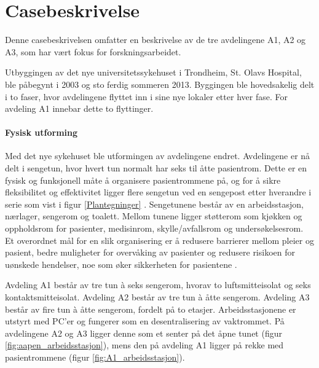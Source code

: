 \chapter{Casebeskrivelse}
\label{chp:case}
Denne casebeskrivelsen omfatter en beskrivelse av de tre avdelingene A1, A2 og A3, som har vært fokus for forskningsarbeidet. 

\noindent
Utbyggingen av det nye universitetssykehuset i Trondheim, St. Olavs Hospital, ble påbegynt i 2003 og sto ferdig sommeren 2013. Byggingen ble hovedsakelig delt i to faser, hvor avdelingene flyttet inn i sine nye lokaler etter hver fase. For avdeling A1 innebar dette to flyttinger.

\subsubsection{Fysisk utforming}
Med det nye sykehuset ble utformingen av avdelingene endret. Avdelingene er nå delt i sengetun, hvor hvert tun normalt har seks til åtte pasientrom. Dette er en fysisk og funksjonell måte å organisere pasientrommene på, og for å sikre fleksibilitet og effektivitet ligger flere sengetun ved en sengepost etter hverandre i serie som vist i figur \ref{Plantegninger} \citep{Aslaksen, sykehuskart}. Sengetunene består av en arbeidsstasjon, nærlager, sengerom og toalett. Mellom tunene ligger støtterom som kjøkken og oppholdsrom for pasienter, medisinrom, skylle/avfallsrom og undersøkelsesrom. Et overordnet mål for en slik organisering er å redusere barrierer mellom pleier og pasient, bedre muligheter for overvåking av pasienter og redusere risikoen for uønskede hendelser, noe som øker sikkerheten for pasientene \citep{Sintef-sengetun}.

\noindent
Avdeling A1 består av tre tun à seks sengerom, hvorav to luftsmitteisolat og seks kontaktsmitteisolat. Avdeling A2 består av tre tun à åtte sengerom. Avdeling A3 består av fire tun à åtte sengerom, fordelt på to etasjer. Arbeidsstasjonene er utstyrt med PC'er og fungerer som en desentralisering av vaktrommet. På avdelingene A2 og A3 ligger denne som et senter på det åpne tunet (figur \ref{fig:aapen_arbeidsstasjon}), mens den på avdeling A1 ligger på rekke med pasientrommene (figur \ref{fig:A1_arbeidsstasjon}).

